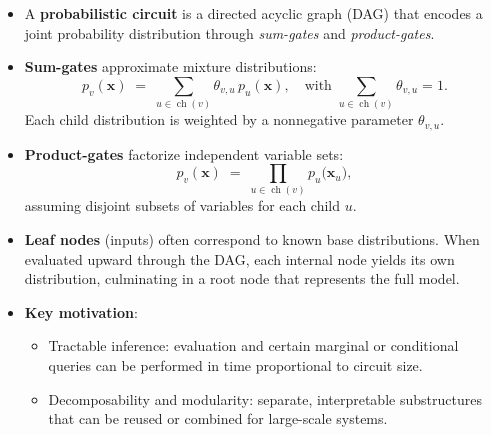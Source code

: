 \begin{frame}[t, allowframebreaks]
\begin{itemize}
  \item A \textbf{probabilistic circuit} is a directed acyclic graph (DAG) that encodes a joint probability distribution through \emph{sum-gates} and \emph{product-gates}.
  \item \textbf{Sum-gates} approximate mixture distributions:
    \[
      p_v(\mathbf{x})
      \;=\;
      \sum_{u\in \operatorname{ch}(v)} \theta_{v,u}\,p_u(\mathbf{x}),
      \quad
      \text{with }
      \sum_{u\in \operatorname{ch}(v)} \theta_{v,u} = 1.
    \]
    Each child distribution is weighted by a nonnegative parameter \(\theta_{v,u}\).
  \item \textbf{Product-gates} factorize independent variable sets:
    \[
      p_v(\mathbf{x})
      \;=\;
      \prod_{u\in \operatorname{ch}(v)} p_u\bigl(\mathbf{x}_{u}\bigr),
    \]
    assuming disjoint subsets of variables for each child \(u\).
  \item \textbf{Leaf nodes} (inputs) often correspond to known base distributions. When evaluated upward through the DAG, each internal node yields its own distribution, culminating in a root node that represents the full model.
  \item \textbf{Key motivation}:
    \begin{itemize}
      \item Tractable inference: evaluation and certain marginal or conditional queries can be performed in time proportional to circuit size.  
      \item Decomposability and modularity: separate, interpretable substructures that can be reused or combined for large-scale systems.
    \end{itemize}
\end{itemize}
\end{frame}

